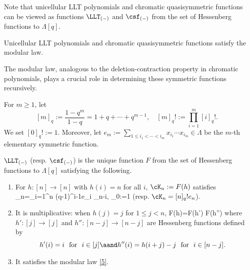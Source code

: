 Note that unicellular LLT polynomials and chromatic quasisymmetric functions can be viewed as  functions $\LLT_{(-)}$ and $\csf_{(-)}$ from the set of Hessenberg functions to $\Lambda[q]$.
\begin{proposition} 
\cite{AN, Ale, Lee} 
Unicellular LLT polynomials and chromatic quasisymmetric functions satisfy the modular law. 
\end{proposition}

The modular law, analogous to the deletion-contraction property in chromatic polynomials, plays a crucial role in determining these symmetric functions recursively.

For $m\geq 1$, let 
\[[m]_q:=\frac{1-q^m}{1-q}=1+q+\cdots +q^{m-1}, \quad  [m]_q!:=\prod_{i=1}^m [i]_q!.\] We set $[0]_q!:=1$. Moreover, let $e_m:=\sum_{1\leq i_1<\cdots <i_m}x_{i_1}\cdots x_{i_m}\in \Lambda$ be the $m$-th elementary symmetric function.

\begin{theorem} \cite{AN,AN2} \label{46}
	$\LLT_{(-)}$ (resp. $\csf_{(-)}$) is the unique function $F$ from the set of Hessenberg functions to $\Lambda[q]$ satisfying the following.
	\begin{enumerate}
		\item For $h:[n]\to [n]$ with $h(i)=n$ for all $i$, $\cK_n:=F(h)$ satisfies  
		\beq \label{13} \cK_n=\sum_{i=1}^n (q-1)^{i-1}e_i \cK_{n-i}, \qquad \cK_0:=1\eeq
		(resp. $\cK_n=[n]_q!e_n$). 
		\item It is multiplicative: when $h(j)=j$ for $1\leq j<n$,
		\beq\label{n3} F(h)=F(h') F(h'')\eeq
		where $h':[j]\to[j]$ and $h'':[n-j]\to [n-j]$ are Hessenberg functions
		defined by
		\[h'(i)=i ~\text{ for }~i\in[j] \aand h''(i)=h(i+j)-j ~\text{ for }~i\in [n-j].\] 
		\item It satisfies the modular law \eqref{5}.
	\end{enumerate}
\end{theorem}

